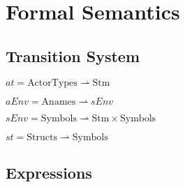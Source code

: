 \section{Formal Semantics}
\subsection{Transition System}

\begin{center}
$at = \text{ActorTypes} \rightharpoonup \text{Stm}$

$aEnv = \text{Anames} \rightharpoonup sEnv$

$sEnv = \text{Symbols} \rightharpoonup \text{Stm} \times \text{Symbols}$

$st = \text{Structs} \rightharpoonup \text{Symbols}$
\end{center}

\subsection{Expressions}
